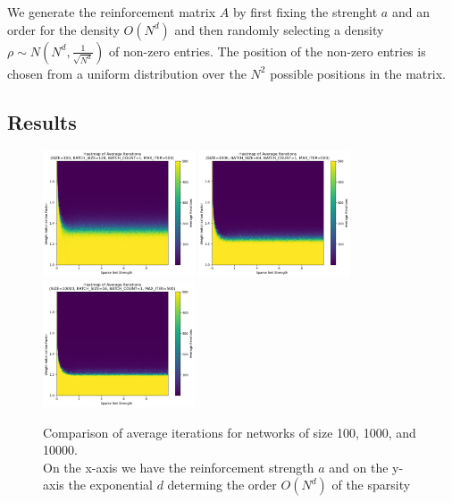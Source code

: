 \documentclass[a4paper,12pt]{report}
\begin{document}
We generate the reinforcement matrix \(A\) by first fixing the strenght $a$ and an order
for the density $O\left(N^d\right)$ and then randomly selecting a density 
\(\rho \sim N\left(N^d, \frac{1}{\sqrt{N^d}}\right)\) of non-zero entries. 
The position of the non-zero entries is chosen from a uniform distribution over the 
\(N^2\) possible positions in the matrix.

\subsection{Results}
\begin{figure}[h!]
  \centering
  \includegraphics[width=0.4\textwidth]{pictures/100_N_avg_it.jpg}
  \includegraphics[width=0.4\textwidth]{pictures/1000_N_avg_it.jpg}
  \includegraphics[width=0.4\textwidth]{pictures/10000_N_avg_it.jpg}
  \caption{Comparison of average iterations for networks of size 100, 1000, and 10000.\\
  On the x-axis we have the reinforcement strength \(a\) and on the 
  y-axis the exponential $d$ determing the order $O\left(N^d\right)$
  of the sparsity}
  \label{fig:avg_iterations_comparison}
\end{figure}
\end{document}
